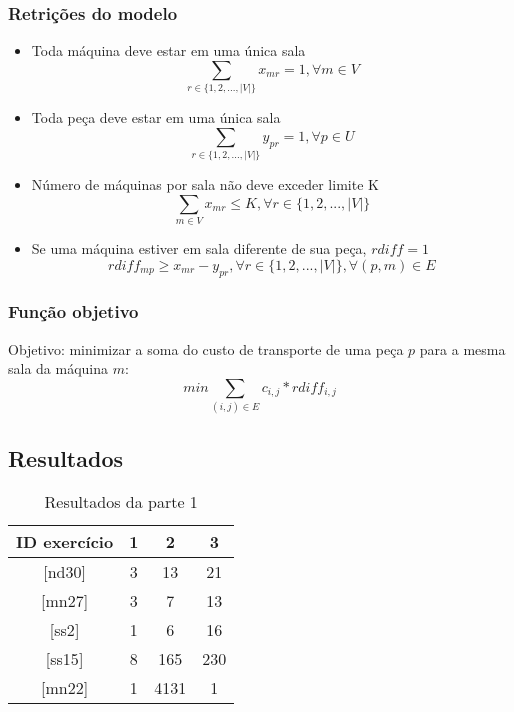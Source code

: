 \documentclass[11pt,letterpaper]{article}
\begin{document}
\subsubsection*{Retrições do modelo}
\begin{itemize}
\item Toda máquina deve estar em uma única sala
\begin{equation*}
  \sum_{r \in  \{1,2,...,|V|\}}x_{mr}=1, \forall m \in V
\end{equation*}

\item Toda peça deve estar em uma única sala
\begin{equation*}
  \sum_{r \in  \{1,2,...,|V|\}}y_{pr}=1, \forall p \in U
\end{equation*}

\item Número de máquinas por sala não deve exceder limite K
\begin{equation*}
  \sum_{m \in V }x_{mr}\leq K, \forall r \in \{1,2,...,|V|\}
\end{equation*}

\item Se uma máquina estiver em sala diferente de sua peça, $rdiff=1$
\begin{equation*}
  rdiff_{mp}\geq x_{mr}-y_{pr}, \forall r \in \{1,2,...,|V|\}, \forall (p,m) \in E
\end{equation*}

\end{itemize}

\subsubsection*{Função objetivo}
Objetivo: minimizar a soma do custo de transporte de uma peça $p$ para
a mesma sala da máquina $m$:
\begin{equation}
min\sum_{(i,j) \in E}c_{i,j}*rdiff_{i,j}
\end{equation}



\subsection{Resultados}


\begin{table}[h!]
\begin{centering}
\begin{tabular}{|c|c|c|c|}
\hline 
ID exercício & 1 & 2 & 3\tabularnewline
\hline 
\hline 
{[}nd30{]}  & 3 & 13  & 21 \tabularnewline
\hline 
 {[}mn27{]} & 3 & 7 & 13 \tabularnewline
\hline 
 {[}ss2{]} & 1 & 6  & 16 \tabularnewline
\hline 
{[}ss15{]} & 8 & 165  & 230 \tabularnewline
\hline 
 {[}mn22{]} & 1 & 4131  & 1 \tabularnewline
\hline 
\end{tabular}
\par\end{centering}

\caption{Resultados da parte 1}
\end{table}
\end{document}
